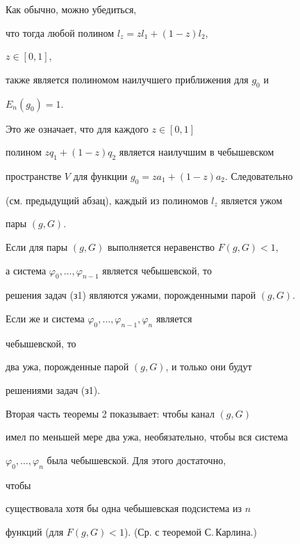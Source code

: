 \begin{pf}
Как обычно, можно убедиться, 


что тогда любой полином $l_z=z l_1+(1-z)l_2$, 


$z\in[0,1]$, 


также является полиномом наилучшего приближения для $g_0$ и 


$E_n(g_0)=1$. 


Это же означает, что для каждого $z\in[0,1]$ 


полином $z q_1+(1-z)q_2$ является наилучшим в чебышевском 


пространстве $V$ для функции $g_0=z a_1+(1-z)a_2$. Следовательно


(см. предыдущий абзац), каждый из полиномов $l_z$ является ужом 


пары $(g,G)$. 


\end{pf} 


 


\begin{cor} Если для пары $(g,G)$ выполняется неравенство $F(g,G)<1$, 


а система $\varphi_0,\dotsc,\varphi_{n-1}$ является чебышевской, то 


решения задач (з1) являются ужами, порожденными парой $(g,G)$. 


Если же и система $\varphi_0,\dotsc,\varphi_{n-1},\varphi_n$ является 


чебышевской, то 


два ужа, порожденные парой $(g,G)$, и только они будут 


решениями задач (з1). 


\end{cor} 


 


\begin{note} Вторая часть теоремы 2 показывает: чтобы канал $(g,G)$ 


имел по меньшей мере два ужа, необязательно, чтобы вся система 


$\varphi_0,\dotsc,\varphi_n$ была чебышевской. Для этого достаточно, 


чтобы 


существовала хотя бы одна чебышевская подсистема из $n$ 


функций (для $F(g,G)<1$). (Ср. с теоремой С.\,Карлина.) 


\end{note} 


